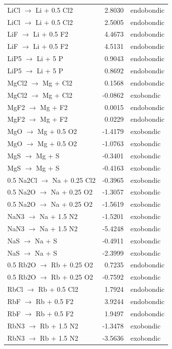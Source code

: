 \begin{longtable}{@{}lrl@{}}
LiCl $\rightarrow$ Li + 0.5 Cl2 & 2.8030 & endobondic \\
LiCl $\rightarrow$ Li + 0.5 Cl2 & 2.5005 & endobondic \\
LiF $\rightarrow$ Li + 0.5 F2 & 4.4673 & endobondic \\
LiF $\rightarrow$ Li + 0.5 F2 & 4.5131 & endobondic \\
LiP5 $\rightarrow$ Li + 5 P & 0.9043 & endobondic \\
LiP5 $\rightarrow$ Li + 5 P & 0.8692 & endobondic \\
MgCl2 $\rightarrow$ Mg + Cl2 & 0.1568 & endobondic \\
MgCl2 $\rightarrow$ Mg + Cl2 & -0.0862 & exobondic \\
MgF2 $\rightarrow$ Mg + F2 & 0.0015 & endobondic \\
MgF2 $\rightarrow$ Mg + F2 & 0.0229 & endobondic \\
MgO $\rightarrow$ Mg + 0.5 O2 & -1.4179 & exobondic \\
MgO $\rightarrow$ Mg + 0.5 O2 & -1.0763 & exobondic \\
MgS $\rightarrow$ Mg + S & -0.3401 & exobondic \\
MgS $\rightarrow$ Mg + S & -0.4163 & exobondic \\
0.5 Na2Cl $\rightarrow$ Na + 0.25 Cl2 & -0.3965 & exobondic \\
0.5 Na2O $\rightarrow$ Na + 0.25 O2 & -1.3057 & exobondic \\
0.5 Na2O $\rightarrow$ Na + 0.25 O2 & -1.5619 & exobondic \\
NaN3 $\rightarrow$ Na + 1.5 N2 & -1.5201 & exobondic \\
NaN3 $\rightarrow$ Na + 1.5 N2 & -5.4248 & exobondic \\
NaS $\rightarrow$ Na + S & -0.4911 & exobondic \\
NaS $\rightarrow$ Na + S & -2.3999 & exobondic \\
0.5 Rb2O $\rightarrow$ Rb + 0.25 O2 & 0.7235 & endobondic \\
0.5 Rb2O $\rightarrow$ Rb + 0.25 O2 & -0.7592 & exobondic \\
RbCl $\rightarrow$ Rb + 0.5 Cl2 & 1.7924 & endobondic \\
RbF $\rightarrow$ Rb + 0.5 F2 & 3.9244 & endobondic \\
RbF $\rightarrow$ Rb + 0.5 F2 & 1.9497 & endobondic \\
RbN3 $\rightarrow$ Rb + 1.5 N2 & -1.3478 & exobondic \\
RbN3 $\rightarrow$ Rb + 1.5 N2 & -3.5636 & exobondic \\

\end{longtable}
